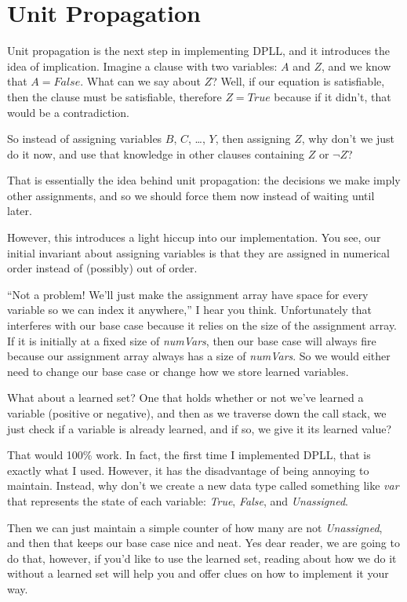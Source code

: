 \section{Unit Propagation}

Unit propagation is the next step in implementing DPLL, and it introduces the
idea of implication. Imagine a clause with two variables: $A$ and $Z$,
and we know that $A = False$. What can we say about $Z$? Well, if our equation is satisfiable, 
then the clause must be satisfiable, therefore $Z = True$ because if it didn't, 
that would be a contradiction.

So instead of assigning variables $B$, $C$, \ldots, $Y$, then assigning $Z$,
why don't we just do it now, and use that knowledge in other clauses
containing $Z$ or $\neg Z$?

That is essentially the idea behind unit propagation: the decisions we make
imply other assignments, and so we should force them now instead of waiting
until later.

However, this introduces a light hiccup into our implementation. You see, 
our initial invariant about assigning variables is that they are
assigned in numerical order instead of (possibly) out of order.

``Not a problem! We'll just make the assignment array have space for every
variable so we can index it anywhere,'' I hear you think. Unfortunately that interferes with
our base case because it relies on the size
of the assignment array. If it is initially at a fixed size of
\textit{numVars}, then our base case will always fire because our assignment
array always has a size of \textit{numVars}. So we would either need to
change our base case or change how we store learned variables.

What about a learned set? One that holds whether or not we've learned a
variable (positive or negative), and then as we traverse down the call stack,
we just check if a variable is already learned, and if so, we give it its learned
value?

That would 100\% work. In fact, the first time I implemented DPLL,
that is exactly what I used. However, it has the disadvantage of being annoying 
to maintain. Instead, why don't we create a new data type called something like
\textit{var} that represents the state of each variable: \textit{True},
\textit{False}, and \textit{Unassigned}.

Then we can just maintain a simple counter of how many are not
\textit{Unassigned}, and then that keeps our base case nice and neat.
Yes dear reader, we are going to do that, however, if you'd like to use the
learned set, reading about how we do it without a learned set will help you
and offer clues on how to implement it your way.

